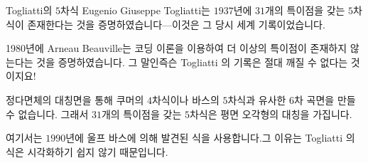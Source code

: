 \begin{surferPage}{Togliatti의 $5$차식}
    Eugenio Giuseppe Togliatti는 $1937$년에 $31$개의 특이점을 갖는 $5$차식이 존재한다는 것을 증명하였습니다---이것은 그 당시 세계 기록이었습니다. 


    1980년에 Arneau Beauville는 코딩 이론을 이용하여 더 이상의 특이점이 존재하지 않는다는 것을 증명하였습니다. 
    그 말인즉슨 Togliatti 의 기록은 절대 깨질 수 없다는 것이지요!

	정다면체의 대칭면을 통해 쿠머의 $4$차식이나 바스의 $5$차식과 유사한 $6$차 곡면을 만들 수 없습니다. 그래서 $31$개의 특이점을 갖는 $5$차식은 평면 오각형의 대칭을 가집니다.

여기서는 $1990$년에 울프 바스에 의해 발견된 식을 사용합니다.그 이유는 Togliatti 의 식은 시각화하기 쉽지 않기 때문입니다.
\end{surferPage}
